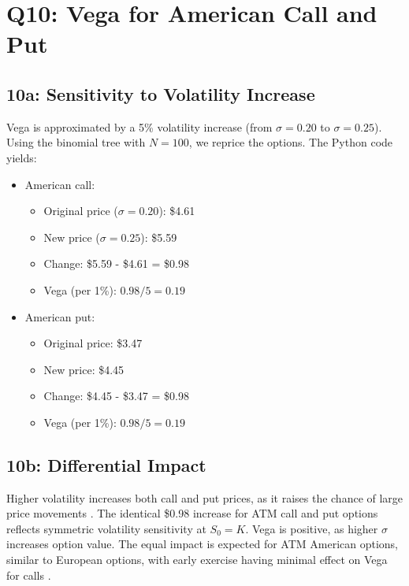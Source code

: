 \documentclass{article}
\begin{document}
\section*{Q10: Vega for American Call and Put}

\subsection*{10a: Sensitivity to Volatility Increase}

Vega is approximated by a 5\% volatility increase (from $\sigma = 0.20$ to $\sigma = 0.25$). Using the binomial tree with $N = 100$, we reprice the options. The Python code yields:

\begin{itemize}
    \item American call:
    \begin{itemize}
        \item Original price ($\sigma = 0.20$): \$4.61
        \item New price ($\sigma = 0.25$): \$5.59
        \item Change: \$5.59 - \$4.61 = \$0.98
        \item Vega (per 1\%): $0.98 / 5 = 0.19$
    \end{itemize}
    \item American put:
    \begin{itemize}
        \item Original price: \$3.47
        \item New price: \$4.45
        \item Change: \$4.45 - \$3.47 = \$0.98
        \item Vega (per 1\%): $0.98 / 5 = 0.19$
    \end{itemize}
\end{itemize}

\subsection*{10b: Differential Impact}

Higher volatility increases both call and put prices, as it raises the chance of large price movements \citep{hull2018options}. The identical \$0.98 increase for ATM call and put options reflects symmetric volatility sensitivity at $S_0 = K$. Vega is positive, as higher $\sigma$ increases option value. The equal impact is expected for ATM American options, similar to European options, with early exercise having minimal effect on Vega for calls \citep{shreve2004stochastic}.
\end{document}
